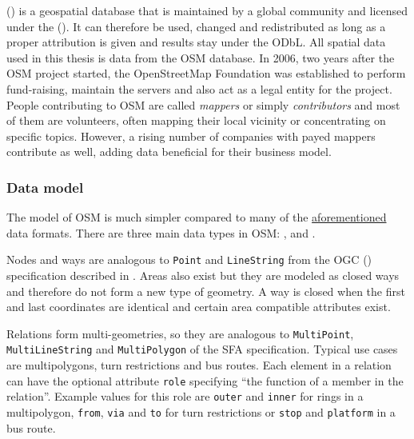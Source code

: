 		 () is a geospatial database that is maintained by a global community and licensed under the  ()\cite{osm-wiki-about}.
		It can therefore be used, changed and redistributed as long as a proper attribution is given and results stay under the ODbL\cite{odbl-summary}.
		All spatial data used in this thesis is data from the OSM database.
		In 2006, two years after the OSM project started, the OpenStreetMap Foundation was established to perform fund-raising, maintain the servers and also act as a legal entity for the project.
		People contributing to OSM are called \textit{mappers} or simply \textit{contributors} and most of them are volunteers, often mapping their local vicinity or concentrating on specific topics.
		However, a rising number of companies with payed mappers contribute as well, adding data beneficial for their business model\cite{osm-corporate-mappers}.
		
		\subsubsection{Data model}
		
			The model of OSM is much simpler compared to many of the \hyperref[subsec:file-formats]{aforementioned} data formats.
			There are three main data types in OSM: ,  and \cite{osm-wiki-data-model}.
			
			Nodes and ways are analogous to \texttt{Point} and \texttt{LineString} from the OGC  () specification described in .
			Areas also exist but they are modeled as closed ways and therefore do not form a new type of geometry.
			A way is closed when the first and last coordinates are identical and certain area compatible attributes exist.
			
			Relations form multi-geometries, so they are analogous to \texttt{MultiPoint}, \texttt{MultiLineString} and \texttt{MultiPolygon} of the SFA specification.
			Typical use cases are multipolygons, turn restrictions and bus routes.
			Each element in a relation can have the optional attribute \texttt{role} specifying \enquote{the function of a member in the relation}\cite{osm-wiki-relation}.
			Example values for this role are \texttt{outer} and \texttt{inner} for rings in a multipolygon, \texttt{from}, \texttt{via} and \texttt{to} for turn restrictions or \texttt{stop} and \texttt{platform} in a bus route.
			
